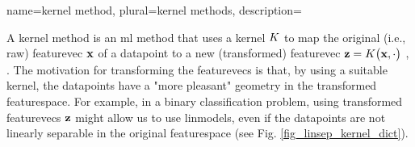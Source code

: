 {name={kernel method}, plural={kernel methods}, 
	description={A \gls{kernel} method is an \gls{ml} method that uses a 
		\gls{kernel} $K$ to map the original (i.e., raw) \gls{featurevec} ${\bf x}$ of a 
		\gls{datapoint} to a new (transformed) \gls{featurevec} ${\bf z} = K\big({\bf x},\cdot\big)$ \cite{LearningKernelsBook}, \cite{LampertNowKernel}.
		The motivation for transforming the \glspl{featurevec} is that, by using a suitable \gls{kernel}, 
		the \glspl{datapoint} have a "more pleasant" geometry in the transformed \gls{featurespace}. 
		For example, in a binary \gls{classification} problem, using transformed \glspl{featurevec} ${\bf z}$ might 
		allow us to use \glspl{linmodel}, even if the \glspl{datapoint} are not linearly 
		separable in the original \gls{featurespace} (see Fig. \ref{fig_linsep_kernel_dict}). 
\begin{figure}[H]
\begin{center}
\end{center}
\end{figure}}}
